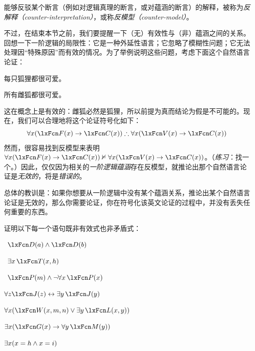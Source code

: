 能够反驳某个断言（例如对逻辑真理的断言，或对蕴涵的断言）的解释，被称为\emph{反解释（counter-interpretation）}，或称\emph{反模型（counter-model）}。

不过，在结束本节之前，我们要提醒一下（无）有效性与（非）蕴涵之间的关系。回想一下一阶逻辑的局限性：它是一种外延性语言；它忽略了模糊性问题；它无法处理因“特殊原因”而有效的情况。为了举例说明这些问题，考虑下面这个自然语言论证：


\begin{earg}
	\item[] 每只狐狸都很可爱。
	\item[\texttherefore] 所有雌狐都很可爱。
\end{earg}


这在概念上是有效的：雌狐必然是狐狸，所以前提为真而结论为假是不可能的。现在，我们可以合理地将这个论证符号化如下：
$$\forall x(\atom{F}{x} \eif \atom{C}{x}) \therefore \forall x(\atom{V}{x} \eif  \atom{C}{x})$$
然而，很容易找到反模型来表明 $\forall x(\atom{F}{x} \eif \atom{C}{x}) \nentails \forall x(\atom{V}{x} \eif  \atom{C}{x})$。（\emph{练习}：找一个。）因此，仅仅因为相关的\emph{一阶逻辑蕴涵}存在反模型，就推论出那个自然语言论证是\emph{无效的}，将是\emph{错误的}。

总体的教训是：如果你想要从一阶逻辑中没有某个蕴涵关系，推论出某个自然语言论证是无效的，那么你需要论证，你在符号化该英文论证的过程中，并没有丢失任何重要的东西。

\practiceproblems

\solutions
\problempart
\label{pr.Contingent}
证明以下每一个语句既非有效式也非矛盾式：


\begin{compactlist}
\item \leftsolutions\ $\atom{D}{a}  \eand \atom{D}{b}$
\item \leftsolutions\ $\exists x\, \atom{T}{x,h}$
\item \leftsolutions\ $\atom{P}{m}  \eand \enot\forall x\, \atom{P}{x}$
\item $\forall z \atom{J}{z} \eiff \exists y\, \atom{J}{y}$
\item $\forall x (\atom{W}{x,m,n} \eor \exists y\,\atom{L}{x,y})$
\item $\exists x (\atom{G}{x} \eif \forall y\, \atom{M}{y})$
\item $\exists x (x = h \wedge x = i)$
\end{compactlist}

